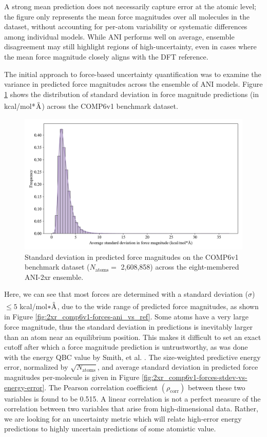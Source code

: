A strong mean prediction does not necessarily capture error at the atomic level; the figure only represents the mean force magnitudes over all molecules in the dataset, without accounting for per-atom variability or systematic differences among individual models.
While ANI performs well on average, ensemble disagreement may still highlight regions of high-uncertainty, even in cases where the mean force magnitude closely aligns with the DFT reference.

The initial approach to force-based uncertainty quantification was to examine the variance in predicted force magnitudes across the ensemble of ANI models. 
Figure \ref{fig:2xr_comp6v1-forces-stdev} shows the distribution of standard deviation in force magnitude predictions (in kcal/mol*$\angstrom$) across the COMP6v1 benchmark dataset.

\begin{figure}[H]
    \centering
    \includegraphics[width=1\linewidth]{Images/2xr_forces/2xr_force_just_stdev.png}
    \caption[Histogram of standard deviation in predicted force magnitudes (COMP6v1)]{Standard deviation in predicted force magnitudes on the COMP6v1 benchmark dataset ($N_\text{atoms}=$ 2,608,858) across the eight-membered ANI-2xr ensemble.}
    \label{fig:2xr_comp6v1-forces-stdev}
\end{figure}

Here, we can see that most forces are determined with a standard deviation ($\sigma$) $\leq 5$ kcal/mol$*\angstrom$, due to the wide range of predicted force magnitudes, as shown in Figure \ref{fig:2xr_comp6v1-forces-ani_vs_ref}.
Some atoms have a very large force magnitude, thus the standard deviation in predictions is inevitably larger than an atom near an equilibrium position.
This makes it difficult to set an exact cutoff after which a force magnitude prediction is untrustworthy, as was done with the energy QBC value by Smith, et al. \cite{ani-1x}.
The size-weighted predictive energy error, normalized by $\sqrt{N_{\text{atoms}}}$, and average standard deviation in predicted force magnitudes per-molecule is given in Figure \ref{fig:2xr_comp6v1-forces-stdev-vs-energy-error}. 
The Pearson correlation coefficient $(\rho_{\text{corr}})$ between these two variables is found to be 0.515.
A linear correlation is not a perfect measure of the correlation between two variables that arise from high-dimensional data.
Rather, we are looking for an uncertainty metric which will relate high-error energy predictions to highly uncertain predictions of some atomistic value.

